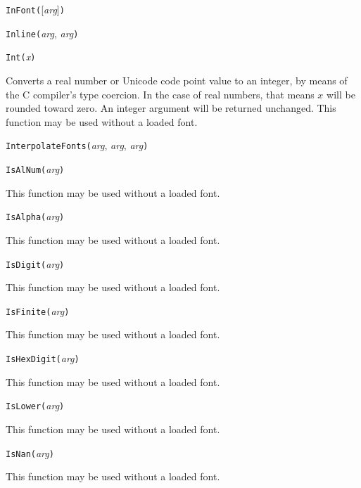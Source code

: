 
\noindent\texttt{InFont(}[\textit{arg}]\texttt{)}


\noindent\texttt{Inline(}\textit{arg}, \textit{arg}\texttt{)}


\noindent\texttt{Int(}\textit{x}\texttt{)}

Converts a real number or Unicode code point value to an integer, by means
of the C compiler's type coercion.  In the case of real numbers, that means
$x$ will be rounded toward zero.  An integer argument will be returned
unchanged.
This function may be used without a loaded font.


\noindent\texttt{InterpolateFonts(}\textit{arg}, \textit{arg}, \textit{arg}\texttt{)}


\noindent\texttt{IsAlNum(}\textit{arg}\texttt{)}

This function may be used without a loaded font.


\noindent\texttt{IsAlpha(}\textit{arg}\texttt{)}

This function may be used without a loaded font.


\noindent\texttt{IsDigit(}\textit{arg}\texttt{)}

This function may be used without a loaded font.


\noindent\texttt{IsFinite(}\textit{arg}\texttt{)}

This function may be used without a loaded font.


\noindent\texttt{IsHexDigit(}\textit{arg}\texttt{)}

This function may be used without a loaded font.


\noindent\texttt{IsLower(}\textit{arg}\texttt{)}

This function may be used without a loaded font.


\noindent\texttt{IsNan(}\textit{arg}\texttt{)}

This function may be used without a loaded font.

